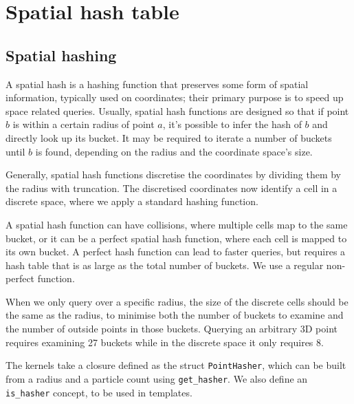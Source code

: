 \documentclass[a4paper]{report}
\begin{document}
\chapter{Spatial hash table}

\section{Spatial hashing}

A spatial hash is a hashing function that preserves some form of spatial information, typically used on coordinates; their primary purpose is to speed up space related queries.
Usually, spatial hash functions are designed so that if point $b$ is within a certain radius of point $a$, it's possible to infer the hash of $b$ and directly look up its bucket. It may be required to iterate a number of buckets until $b$ is found, depending on the radius and the coordinate space's size.

Generally, spatial hash functions discretise the coordinates by dividing them by the radius with truncation. The discretised coordinates now identify a cell in a discrete space, where we apply a standard hashing function.

A spatial hash function can have collisions, where multiple cells map to the same bucket, or it can be a perfect spatial hash function, where each cell is mapped to its own bucket. A perfect hash function can lead to faster queries, but requires a hash table that is as large as the total number of buckets. We use a regular non-perfect function.

When we only query over a specific radius, the size of the discrete cells should be the same as the radius, to minimise both the number of buckets to examine and the number of outside points in those buckets.
Querying an arbitrary 3D point requires examining 27 buckets while in the discrete space it only requires 8.

The kernels take a closure defined as the struct \lstinline{PointHasher}, which can be built from a radius and a particle count using \lstinline{get_hasher}. We also define an \lstinline{is_hasher} concept, to be used in templates.
\end{document}
